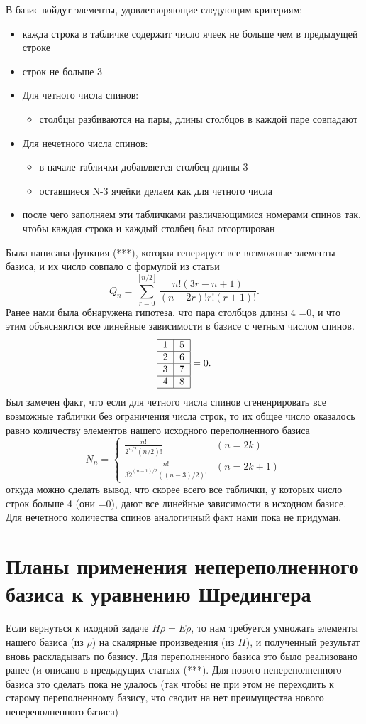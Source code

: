 \documentclass[]{article}
\begin{document}
В базис войдут элементы, удовлетворяющие следующим критериям:
\begin{itemize}
	\item кажда строка в табличке содержит число ячеек не больше чем в предыдущей строке
	\item строк не больше 3
	\item Для четного числа спинов:
	\begin{itemize}
		\item столбцы разбиваются на пары, длины столбцов в каждой паре совпадают
	\end{itemize}
	\item Для нечетного числа спинов:
	\begin{itemize}
		\item в начале таблички добавляется столбец длины 3
		\item оставшиеся N-3 ячейки делаем как для четного числа
	\end{itemize}
	\item после чего заполняем эти табличками различающимися номерами спинов так, чтобы каждая строка и каждый столбец был отсортирован
\end{itemize}

Была написана функция (***), которая генерирует все возможные элементы базиса, и их число совпало с формулой из статьи
$$Q_n = \sum_{r=0}^{[n/2]}\frac{n!(3r-n+1)}{(n-2r)!r!(r+1)!}.$$
Ранее нами была обнаружена гипотеза, что пара столбцов длины 4 =0, и что этим объясняются все линейные зависимости в базисе с четным числом спинов.
$$ \begin{tabular}{ |l|l| }
\hline
1 & 5 \\ \hline
2 & 6\\ \hline
3 & 7\\ \hline
4 & 8\\
\hline
\end{tabular}=0 .
$$
Был замечен факт, что если для четного числа спинов сгененрировать все возможные таблички без ограничения числа строк,
то их общее число оказалось равно количеству элементов нашего исходного переполненного базиса
$$N_n=\begin{cases}
\frac{n!}{2^{n/2}(n/2)!} & (n=2k)\\
\frac{n!}{3\dot 2^{(n-1)/2}((n-3)/2)!} & (n=2k+1)
\end{cases}$$
откуда можно сделать вывод, что скорее всего все таблички, у которых число строк больше 4 (они =0), дают все линейные зависимости в исходном базисе.
Для нечетного количества спинов аналогичный факт нами пока не придуман.

\section{Планы применения непереполненного базиса к уравнению Шредингера}
Если вернуться к иходной задаче $H \rho = E \rho$, то 
нам требуется умножать элементы нашего базиса (из $\rho$) на скалярные произведения (из $H$), и полученный результат вновь раскладывать по базису.
Для переполненного базиса это было реализовано ранее (и описано в предыдущих статьях (***).
Для нового непереполненного базиса это сделать пока не удалось (так чтобы не при этом не переходить к старому переполненному базису, что сводит на нет преимущества нового непереполненного базиса)
\end{document}
